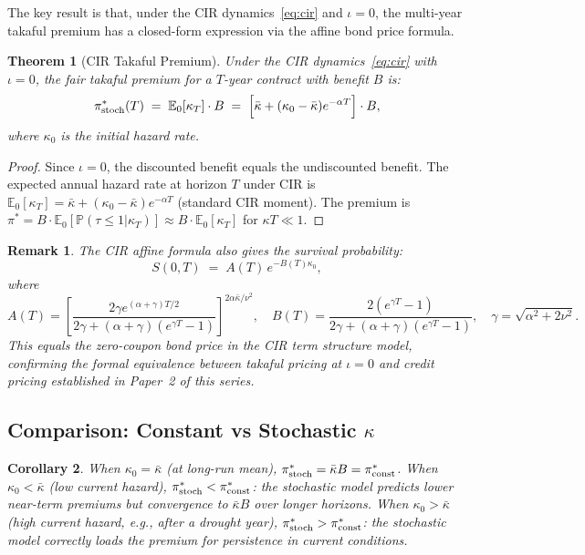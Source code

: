 \documentclass[12pt,a4paper]{article}
\newtheorem{theorem}{Theorem}[section]
\newtheorem{corollary}[theorem]{Corollary}
\newtheorem{remark}{Remark}[section]
\newcommand{\kbar}{\bar{\kappa}}
\newcommand{\E}{\mathbb{E}}
\newcommand{\Prob}{\mathbb{P}}
\begin{document}
The key result is that, under the CIR dynamics~\eqref{eq:cir} and $\iota=0$,
the multi-year takaful premium has a closed-form expression via the affine bond
price formula.

\begin{theorem}[CIR Takaful Premium]
  \label{thm:cir_premium}
  Under the CIR dynamics~\eqref{eq:cir} with $\iota=0$, the fair takaful premium for
  a $T$-year contract with benefit $B$ is:
  \begin{equation}
    \pi^*_{\rm stoch}(T) \;=\; \E_0[\kappa_T]\cdot B
      \;=\; \Bigl[\kbar + (\kappa_0 - \kbar)e^{-\alpha T}\Bigr]\cdot B,
    \label{eq:cir_premium}
  \end{equation}
  where $\kappa_0$ is the initial hazard rate.
\end{theorem}

\begin{proof}
  Since $\iota=0$, the discounted benefit equals the undiscounted benefit.
  The expected annual hazard rate at horizon $T$ under CIR is
  $\E_0[\kappa_T] = \kbar + (\kappa_0-\kbar)e^{-\alpha T}$ (standard CIR moment).
  The premium is $\pi^*=B\cdot\E_0[\Prob(\tau\leq 1|\kappa_T)]
  \approx B\cdot\E_0[\kappa_T]$ for $\kappa T\ll1$.
\end{proof}

\begin{remark}
The CIR affine formula also gives the \emph{survival probability}:
\begin{equation}
  S(0,T) \;=\; A(T)\,e^{-B(T)\kappa_0},
  \label{eq:survival_cir}
\end{equation}
where
\[
  A(T) = \left[\frac{2\gamma e^{(\alpha+\gamma)T/2}}{2\gamma+(\alpha+\gamma)(e^{\gamma T}-1)}\right]^{2\alpha\kbar/\nu^2},
  \quad
  B(T) = \frac{2(e^{\gamma T}-1)}{2\gamma+(\alpha+\gamma)(e^{\gamma T}-1)},
  \quad
  \gamma = \sqrt{\alpha^2+2\nu^2}.
\]
This equals the zero-coupon bond price in the CIR term structure model, confirming
the formal equivalence between takaful pricing at $\iota=0$ and credit pricing
established in Paper~2 of this series.
\end{remark}

\subsection{Comparison: Constant vs Stochastic $\kappa$}

\begin{corollary}
  \label{cor:comp}
  When $\kappa_0=\kbar$ (at long-run mean), $\pi^*_{\rm stoch}=\kbar B = \pi^*_{\rm const}$.
  When $\kappa_0<\kbar$ (low current hazard), $\pi^*_{\rm stoch}<\pi^*_{\rm const}$:
  the stochastic model predicts lower near-term premiums but convergence to $\kbar B$
  over longer horizons.
  When $\kappa_0>\kbar$ (high current hazard, e.g., after a drought year),
  $\pi^*_{\rm stoch}>\pi^*_{\rm const}$: the stochastic model correctly loads the
  premium for persistence in current conditions.
\end{corollary}
\end{document}
